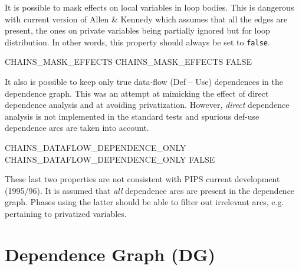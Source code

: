 \documentclass[a4paper]{report}
\begin{document}
It is possible to mask effects on local variables in loop bodies. This
is dangerous with current version of Allen \& Kennedy which assumes that
all the edges are present, the ones on private variables being
partially ignored but for loop distribution. In other words, this
property should always be set to \verb+false+.

\begin{PipsProp}{CHAINS_MASK_EFFECTS}
CHAINS_MASK_EFFECTS FALSE
\end{PipsProp}

It also is possible to keep only true data-flow (Def -- Use) dependences in
the dependence graph. This was an attempt at mimicking the effect of
direct dependence analysis and at avoiding privatization. However, {\em
direct} dependence analysis is not implemented in the standard tests and
spurious def-use dependence arcs are taken into account.

\begin{PipsProp}{CHAINS_DATAFLOW_DEPENDENCE_ONLY}
CHAINS_DATAFLOW_DEPENDENCE_ONLY FALSE
\end{PipsProp}

These last two properties are not consistent with PIPS current development
(1995/96). It is assumed that {\em all} dependence arcs are present in the
dependence graph. Phases using the latter should be able to filter out
irrelevant arcs, e.g. pertaining to privatized variables.


\section{Dependence Graph (DG)}
\label{subsection-dependence-graph}
\end{document}
